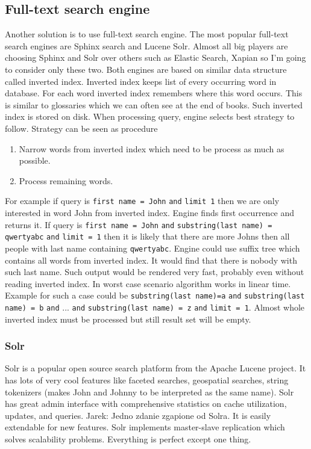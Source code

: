 \documentclass[10pt,a4paper]{article}
\newcommand{\jarek}[1]{\noindent\colorbox{myYellow}{Jarek: #1}}
\begin{document}
\subsection{Full-text search engine}
Another solution is to use full-text search engine. The most popular full-text search engines are Sphinx search and Lucene Solr. Almost all big players are choosing Sphinx and Solr over others such as Elastic Search, Xapian so I'm going to consider only these two. Both engines are based on similar data structure called inverted index. Inverted index keeps list of every occurring word in database. For each word inverted index remembers where this word occurs. This is similar to glossaries which we can often see at the end of books. Such inverted index is stored on disk. When processing query, engine selects best strategy to follow. Strategy can be seen as procedure
\begin{enumerate}
\item Narrow words from inverted index which need to be process as much as possible. 
\item Process remaining words. 
\end{enumerate}
For example if query is \verb|first name = John| \verb|and| \verb|limit 1| then we are only interested in word John from inverted index. Engine finds first occurrence and returns it. If query is \verb|first name = John| \verb|and| \verb|substring(last name) = qwertyabc| \verb|and| \verb|limit = 1| then it is likely that there are more Johns then all people with last name containing \verb|qwertyabc|. Engine could use suffix tree which contains all words from inverted index. It would find that there is nobody with such last name. Such output would be rendered very fast, probably even without reading inverted index. In worst case scenario algorithm works in linear time. Example for such a case could be \verb|substring(last name)=a| \verb|and| \verb|substring(last name) = b| \verb|and| ... \verb|and| \verb|substring(last name) = z| \verb|and| \verb|limit = 1|. Almost whole inverted index must be processed but still result set will be empty.

\subsubsection{Solr}

Solr is a popular open source search platform from the Apache Lucene project. It has lots of very cool features like faceted searches, geospatial searches, string tokenizers (makes John and Johnny to be interpreted as the same name). Solr has great admin interface with comprehensive statistics on cache utilization, updates, and queries. \jarek{Jedno zdanie zgapione od Solra}. It is easily extendable for new features. Solr implements master-slave replication which solves scalability problems. Everything is perfect except one thing. 
\end{document}
